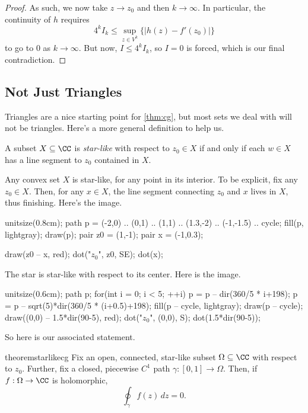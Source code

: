 \begin{proof}
	As such, we now take $z\to z_0$ and then $k\to\infty$. In particular, the continuity of $h$ requires
	\[4^kI_k\le\sup_{z\in V^k}\{|h(z)-f'(z_0)|\}\]
	to go to $0$ as $k\to\infty$. But now, $I\le 4^kI_k$, so $I=0$ is forced, which is our final contradiction.
\end{proof}

\subsection{Not Just Triangles}
Triangles are a nice starting point for \autoref{thm:cg}, but most sets we deal with will not be triangles. Here's a more general definition to help us.
\begin{definition}
	A subset $X\subseteq\CC$ is \textit{star-like} with respect to $z_0\in X$ if and only if each $w\in X$ has a line segment to $z_0$ contained in $X$.
\end{definition}
\begin{example}
	Any convex set $X$ is star-like, for any point in its interior. To be explicit, fix any $z_0\in X$. Then, for any $x\in X$, the line segment connecting $z_0$ and $x$ lives in $X$, thus finishing. Here's the image.
	\begin{center}
		\begin{asy}
			unitsize(0.8cm);
			path p = (-2,0) .. (0,1) .. (1,1) .. (1.3,-2) .. (-1,-1.5) .. cycle;
			fill(p, lightgray);
			draw(p);
			pair z0 = (1,-1);
			pair x = (-1,0.3);

			draw(z0 -- x, red);
			dot("$z_0$", z0, SE);
			dot(x);
		\end{asy}
	\end{center}
\end{example}
\begin{ex}
	The star is star-like with respect to its center. Here is the image.
	\begin{center}
		\begin{asy}
			unitsize(0.6cm);
			path p;
			for(int i = 0; i < 5; ++i)
			{
				p = p -- dir(360/5 * i+198);
				p = p -- sqrt(5)*dir(360/5 * (i+0.5)+198);
			}
			fill(p -- cycle, lightgray);
			draw(p -- cycle);
			draw((0,0) -- 1.5*dir(90-5), red);
			dot("$z_0$", (0,0), S);
			dot(1.5*dir(90-5));
		\end{asy}
	\end{center}
\end{ex}
So here is our associated statement.
\begin{restatable}{theorem}{starlikecg} \label{thm:starlikecg}
	Fix an open, connected, star-like subset $\Omega\subseteq\CC$ with respect to $z_0$. Further, fix a closed, piecewise $C^1$ path $\gamma:[0,1]\to\Omega$. Then, if $f:\Omega\to\CC$ is holomorphic,
	\[\oint_\gamma f(z)\,dz=0.\]
\end{restatable}

